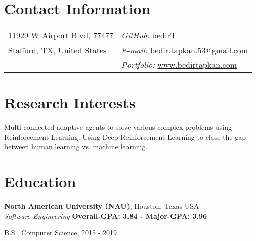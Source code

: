 \documentclass[margin,line]{res}
\newenvironment{list1}{
  \begin{list}{\ding{113}}{%
      \setlength{\itemsep}{0in}
      \setlength{\parsep}{0in} \setlength{\parskip}{0in}
      \setlength{\topsep}{0in} \setlength{\partopsep}{0in} 
      \setlength{\leftmargin}{0.17in}}}{\end{list}}
\newenvironment{list2}{
  \begin{list}{$\bullet$}{%
      \setlength{\itemsep}{0in}
      \setlength{\parsep}{0in} \setlength{\parskip}{0in}
      \setlength{\topsep}{0in} \setlength{\partopsep}{0in} 
      \setlength{\leftmargin}{0.2in}}}{\end{list}}
\begin{document}

\begin{resume}
\section{\sc Contact Information}
\vspace{.05in}
\begin{tabular}{@{}p{2in}p{4in}}
11929 W Airport Blvd, 77477 & \hfill {\it GitHub:}  \href{https://github.com/bedirT}{bedirT} \\
Stafford, TX, United States & \hfill {\it E-mail:}  \href{mailto:bedir.tapkan.53@gmail.com}{bedir.tapkan.53@gmail.com}\\
& \hfill {\it Portfolio:}  \href{www.bedirtapkan.com}{www.bedirtapkan.com} \\
\end{tabular}


\section{\sc Research Interests}
Multi-connected adaptive agents to solve various complex problems using Reinforcement Learning. Using Deep Reinforcement Learning to close the gap between human learning vs. machine learning.

\section{\sc Education}


{\bf North American University (NAU)}, Houston, Texas USA\\
{\em Software Engineering}  \hfill {\bf Overall-GPA: 3.84 - Major-GPA: 3.96}\\
\vspace{-.3cm}
\begin{list1}
\item[] B.S., Computer Science,  2015 - 2019
\end{list1}



\end{resume}
\end{document}
